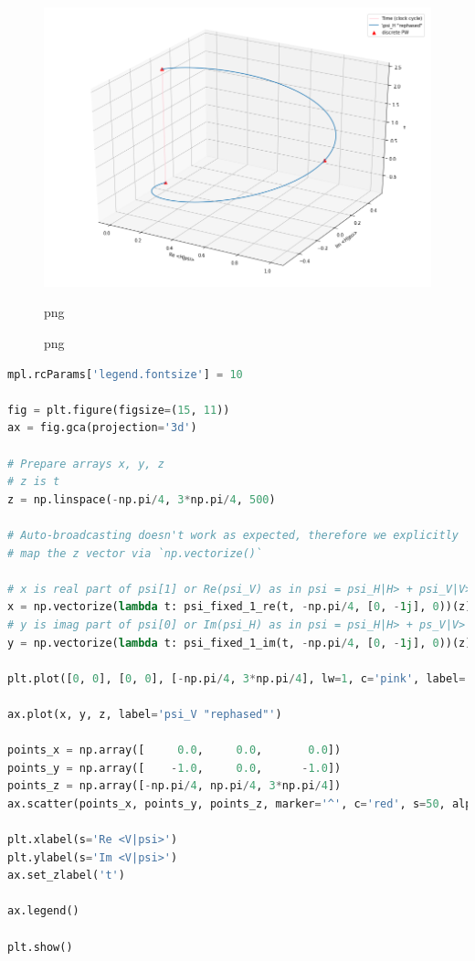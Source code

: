 \begin{figure}
\centering
\includegraphics[width=\textwidth/2]{img/psi_H.png}
\caption[]{png}{png}
\end{figure}

\begin{lstlisting}[language=Python]
mpl.rcParams['legend.fontsize'] = 10

fig = plt.figure(figsize=(15, 11))
ax = fig.gca(projection='3d')

# Prepare arrays x, y, z
# z is t
z = np.linspace(-np.pi/4, 3*np.pi/4, 500)

# Auto-broadcasting doesn't work as expected, therefore we explicitly
# map the z vector via `np.vectorize()`

# x is real part of psi[1] or Re(psi_V) as in psi = psi_H|H> + psi_V|V>
x = np.vectorize(lambda t: psi_fixed_1_re(t, -np.pi/4, [0, -1j], 0))(z) 
# y is imag part of psi[0] or Im(psi_H) as in psi = psi_H|H> + ps_V|V>
y = np.vectorize(lambda t: psi_fixed_1_im(t, -np.pi/4, [0, -1j], 0))(z) 

plt.plot([0, 0], [0, 0], [-np.pi/4, 3*np.pi/4], lw=1, c='pink', label='Time (clock cycle)')

ax.plot(x, y, z, label='psi_V "rephased"')

points_x = np.array([     0.0,     0.0,       0.0])
points_y = np.array([    -1.0,     0.0,      -1.0])
points_z = np.array([-np.pi/4, np.pi/4, 3*np.pi/4])
ax.scatter(points_x, points_y, points_z, marker='^', c='red', s=50, alpha=1.0, label='discrete PW')

plt.xlabel(s='Re <V|psi>')
plt.ylabel(s='Im <V|psi>')
ax.set_zlabel('t')

ax.legend()

plt.show()
\end{lstlisting}

